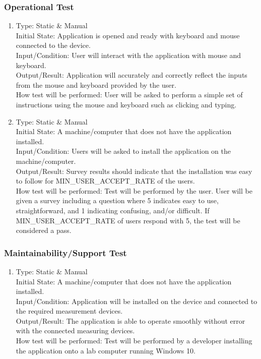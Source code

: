 \documentclass[12pt, titlepage]{article}
\begin{document}
\subsubsection{Operational Test}

\begin{adjustwidth}{2.2em}{0pt}
\begin{enumerate}[{NF-OT}1.]
    \item Type: Static \& Manual\\
    Initial State: Application is opened and ready with keyboard and mouse connected to the device.\\
    Input/Condition: User will interact with the application with mouse and keyboard.\\
    Output/Result: Application will accurately and correctly reflect the inputs from the mouse and keyboard provided by the user.\\
    How test will be performed: User will be asked to perform a simple set of instructions using the mouse and keyboard such as clicking and typing.
    
    \item Type: Static \& Manual\\
    Initial State: A machine/computer that does not have the application installed.\\
    Input/Condition: Users will be asked to install the application on the machine/computer.\\
    Output/Result: Survey results should indicate that the installation was easy to follow for MIN\_USER\_ACCEPT\_RATE of the users.\\
    How test will be performed: Test will be performed by the user. User will be given a survey including a question where 5 indicates easy to use, straightforward, and 1 indicating confusing, and/or difficult. If MIN\_USER\_ACCEPT\_RATE of users respond with 5, 
    the test will be considered a pass.
\end{enumerate}
\end{adjustwidth}

\subsubsection{Maintainability/Support Test}

\begin{adjustwidth}{2.2em}{0pt}
\begin{enumerate}[{NF-MT}1.]
    \item Type: Static \& Manual\\
    Initial State: A machine/computer that does not have the application installed.\\
    Input/Condition: Application will be installed on the device and connected to the required measurement devices.\\
    Output/Result: The application is able to operate smoothly without error with the connected measuring devices.\\
    How test will be performed: Test will be performed by a developer installing the application onto a lab computer running Windows 10.
\end{enumerate}
\end{adjustwidth}
\end{document}
